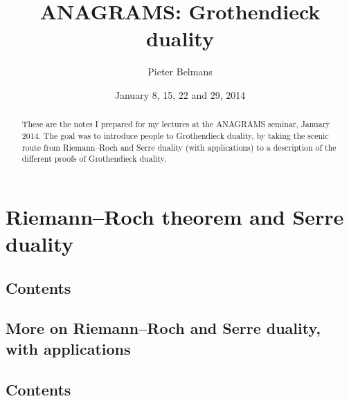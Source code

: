 \documentclass[oneside,openany,a4paper]{memoir}
\title{ANAGRAMS: Grothendieck duality}
\author{Pieter Belmans}
\date{January 8, 15, 22 and 29, 2014}
\begin{document}
\frontmatter
\thispagestyle{empty}
\maketitle

\begin{abstract}
  These are the notes I prepared for my lectures at the ANAGRAMS seminar, January 2014. The goal was to introduce people to Grothendieck duality, by taking the scenic route from Riemann--Roch and Serre duality (with applications) to a description of the different proofs of Grothendieck duality.
\end{abstract}

\setcounter{tocdepth}{1}
\tableofcontents*

\mainmatter
\setcounter{secnumdepth}{2}

\chapter{Riemann--Roch theorem and Serre duality}
\begin{refsection}
  

  \startcontents[chapters]
  \section*{Contents}
  \clearpage

  
  \clearpage
  
  \printbibliography[heading=subbibliography]
\end{refsection}


\begin{refsection}
  \chapter{More on Riemann--Roch and Serre duality, with applications}

  

  \startcontents[chapters]
  \section*{Contents}
  \clearpage

  
  \clearpage

  \printbibliography[heading=subbibliography]
\end{refsection}
\end{document}
